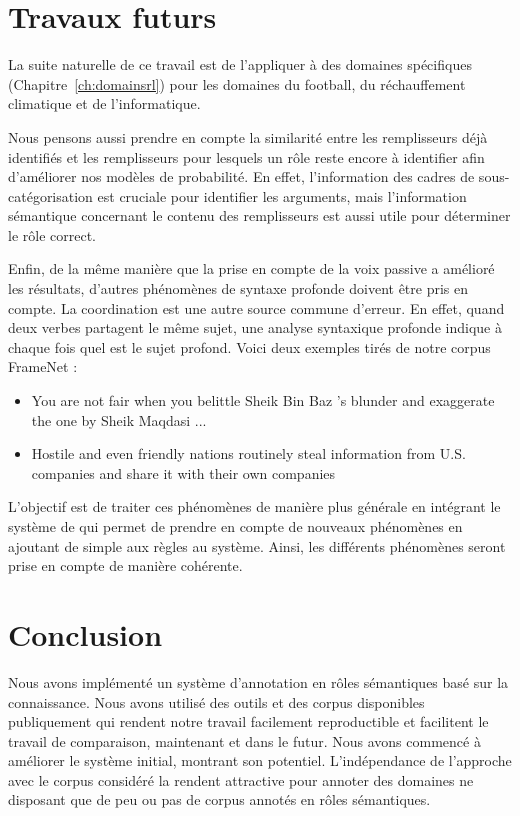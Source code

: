 \section{Travaux futurs}

La suite naturelle de ce travail est de l'appliquer à des domaines spécifiques
(Chapitre~\ref{ch:domainsrl}) pour les domaines du football, du réchauffement
climatique et de l'informatique.

Nous pensons aussi prendre en compte la similarité entre les remplisseurs déjà
identifiés et les remplisseurs pour lesquels un rôle reste encore à identifier
afin d'améliorer nos modèles de probabilité. En effet, l'information des cadres
de sous-catégorisation est cruciale pour identifier les arguments, mais
l'information sémantique concernant le contenu des remplisseurs est aussi utile
pour déterminer le rôle correct.

Enfin, de la même manière que la prise en compte de la voix passive a amélioré
les résultats, d'autres phénomènes de syntaxe profonde doivent être pris en
compte. La coordination est une autre source commune d'erreur. En effet, quand
deux verbes partagent le même sujet, une analyse syntaxique profonde indique à
chaque fois quel est le sujet profond. Voici deux exemples tirés de notre
corpus FrameNet :

\begin{itemize}
    \item You are not fair when you belittle Sheik Bin Baz 's blunder and
          exaggerate the one by Sheik Maqdasi ...
    \item Hostile and even friendly nations routinely steal information from
          U.S. companies and share it with their own companies
\end{itemize}

L'objectif est de traiter ces phénomènes de manière plus générale en intégrant
le système de \cite{ribeyre2013systeme} qui permet de prendre en compte de
nouveaux phénomènes en ajoutant de simple aux règles au système. Ainsi, les
différents phénomènes seront prise en compte de manière cohérente.

\section{Conclusion}

Nous avons implémenté un système d'annotation en rôles sémantiques basé sur la
connaissance. Nous avons utilisé des outils et des corpus disponibles
publiquement qui rendent notre travail facilement reproductible et facilitent
le travail de comparaison, maintenant et dans le futur. Nous avons commencé à
améliorer le système initial, montrant son potentiel. L'indépendance de
l'approche avec le corpus considéré la rendent attractive pour annoter des
domaines ne disposant que de peu ou pas de corpus annotés en rôles sémantiques.
